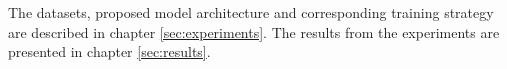 The datasets, proposed model architecture and corresponding training strategy are described in chapter \ref{sec:experiments}. The results from the experiments are presented in chapter \ref{sec:results}. 
\begin{comment}
\section{Signals used for PHM}
In the work of Pandhare et al. \cite{Pandhare2021} just vibration signals in different spatial directions are measured with sensors, installed at various locations on the BSD. Azamfar et al. \cite{AZAMFAR2020103932} additionally use sound pressure sensors to capture the acoustic level and extract torque and speed signals from the controller. In this thesis also the mechanical power, target electrical power and actual electrical power signals were extracted from the controller. Pandhare et al. and Azamfar et al. record machine data during BSD steady-state motion. In this thesis machine data is collected during different machine excitements (constant speed excitements, direction change excitements and sweep excitement) along the machine tools X-axis. These different signals were evaluated for their suitability for PHM of BSDs


Both Pandhare et al. \cite{Pandhare2021} and Azamfar et al. \cite{AZAMFAR2020103932} feed the data recorded during BSD steady-state motion as one single input to their models. During the phases of constant BSD motion, the amplitude of the signals changess. Azamfar et al. assume that the shorter sequences created by a windowing function just capture limited information about these changes and are therefore not a proper tool for PHM \cite{AZAMFAR2020103932}. In the thesis a windowing function was evaluated for the PHM of BSDs. Windowing functions make the BSD experiments less dependent from specific BSD excitements. When beeing able to check the BSD degradation with short recorded windows, one can make statements about the BSD health status with data redcorded in real time use. Extra experiments 
\end{comment}


